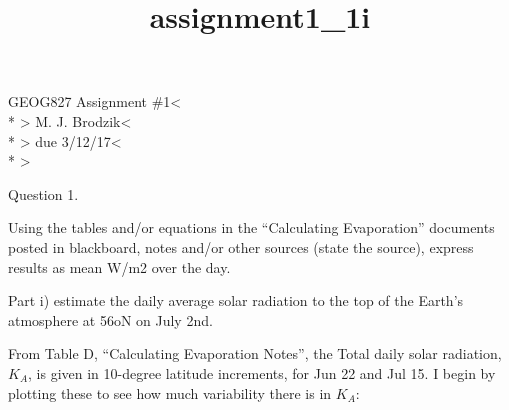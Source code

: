 \documentclass{article}
\title{assignment1\_1i}
\def\br{\hspace*{\fill} \\* }
\begin{document}
    
    
    \maketitle
    
    

    
    GEOG827 Assignment \#1\textless{}\br\textgreater{} M. J.
Brodzik\textless{}\br\textgreater{} due
3/12/17\textless{}\br\textgreater{}

Question 1.

Using the tables and/or equations in the ``Calculating Evaporation''
documents posted in blackboard, notes and/or other sources (state the
source), express results as mean W/m2 over the day.

Part i) estimate the daily average solar radiation to the top of the
Earth's atmosphere at 56oN on July 2nd.

From Table D, ``Calculating Evaporation Notes'', the Total daily solar
radiation, \(K_A\), is given in 10-degree latitude increments, for Jun
22 and Jul 15. I begin by plotting these to see how much variability
there is in \(K_A\):
\end{document}
